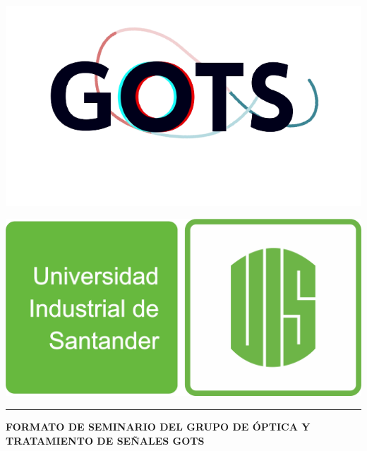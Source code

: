 \documentclass[spanish,notitlepage,letterpaper,11pt]{article} %
\numberwithin{equation}{subsection}
\begin{document}
\begin{titlepage}
\centering
\begin{minipage}{.4\textwidth}
\centering
\includegraphics[width=\linewidth]{Figures/LoGOTS.png}
\end{minipage}%
\begin{minipage}{.4\textwidth}
\centering
\includegraphics[width=\linewidth]{Figures/logouis.png}
\end{minipage}

\vspace{\baselineskip}
\rule{\textwidth}{2pt}
\vspace{\baselineskip}
\vspace{\baselineskip}
\vspace{\baselineskip}
\vspace{\baselineskip}
\vspace{\baselineskip}

\huge\textbf{FORMATO DE SEMINARIO DEL GRUPO DE ÓPTICA Y TRATAMIENTO DE SEÑALES GOTS} \\

\vspace{\baselineskip}
\vspace{\baselineskip}


\end{titlepage}
\end{document}
